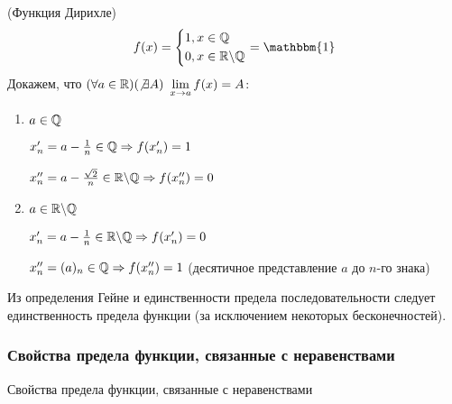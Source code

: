 \begin{example} (Функция Дирихле)
	\[
		f(x) = \System{&{1, x \in \Q} \\ &{0, x \in \R \bs \Q}} = \mathbbm{1}
	\]
	Докажем, что $(\forall a \in \mathbb{R})(\not\exists A)\ \lim\limits_{x \rightarrow a} f(x) = A$:
	
	\begin{enumerate}
		\item $a \in \mathbb{Q}$
		
		$x'_n = a - \frac{1}{n} \in \mathbb{Q} \Rightarrow f(x'_n) = 1$
		
		$x''_n = a - \frac{\sqrt{2}}{n} \in \mathbb{R} \backslash \mathbb{Q} \Rightarrow f(x''_n) = 0$
		
		\item $a \in \mathbb{R} \backslash \mathbb{Q}$
		
		$x'_n = a - \frac{1}{n} \in \mathbb{R} \backslash \mathbb{Q} \Rightarrow f(x'_n) = 0$
		
		$x''_n = (a)_n \in \mathbb{Q} \Rightarrow f(x''_n) = 1$
		(десятичное представление $a$ до $n$-го знака)
	\end{enumerate}
\end{example}

\begin{note} Из определения Гейне и единственности
	предела последовательности следует единственность предела
	функции (за исключением некоторых бесконечностей).
\end{note}

\subsubsection*{Свойства предела функции, связанные с неравенствами}

\begin{theorem}
	Свойства предела функции, связанные с неравенствами
\end{theorem}

